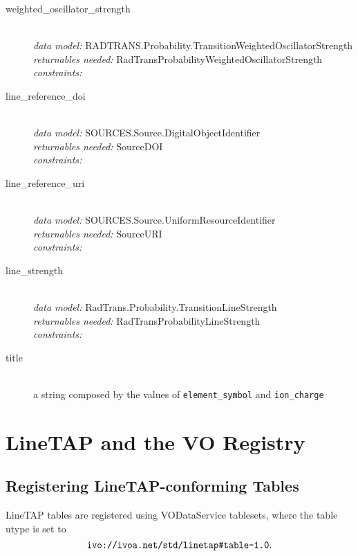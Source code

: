 \documentclass[11pt,a4paper]{ivoa}
\begin{document}
\begin{description}
	\item [weighted\_oscillator\_strength]\hfill\\
	\textit{data model:}  RADTRANS.Probability.TransitionWeightedOscillatorStrength\\
	\textit{returnables needed:} RadTransProbabilityWeightedOscillatorStrength\\
 	   \textit{constraints:}

	\item [line\_reference\_doi]\hfill\\
	\textit{data model:} SOURCES.Source.DigitalObjectIdentifier\\
	\textit{returnables needed:} SourceDOI\\
	\textit{constraints:}

	\item [line\_reference\_uri]\hfill\\
	\textit{data model:} SOURCES.Source.UniformResourceIdentifier\\
	\textit{returnables needed:} SourceURI\\
	\textit{constraints:}

	\item [line\_strength]\hfill\\
	\textit{data model:} RadTrans.Probability.TransitionLineStrength\\
	\textit{returnables needed:} RadTransProbabilityLineStrength\\
        \textit{constraints:}

\item [title]\hfill\\
	a string composed by the values of  \texttt{element\_symbol} and \texttt{ion\_charge}


\end{description}

\section{LineTAP and the VO Registry}

\subsection{Registering LineTAP-conforming Tables}

LineTAP tables are registered using VODataService
\citep{2010ivoa.spec.1202P} tablesets, where the table utype is set to
$$\hbox{\verb|ivo://ivoa.net/std/linetap#table-1.0|}.$$
\end{document}
